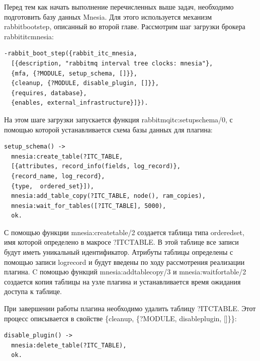 Перед тем как начать выполнение перечисленных выше задач, необходимо подготовить базу данных Mnesia. Для этого используется механизм rabbit\underline{\hspace{0.25cm}}boot\underline{\hspace{0.25cm}}step, описанный во второй главе. Рассмотрим шаг загрузки брокера rabbit\underline{\hspace{0.25cm}}itc\underline{\hspace{0.25cm}}mnesia:
\begin{lstlisting}
-rabbit_boot_step({rabbit_itc_mnesia,
  [{description, "rabbitmq interval tree clocks: mnesia"},
  {mfa, {?MODULE, setup_schema, []}},
  {cleanup, {?MODULE, disable_plugin, []}},
  {requires, database},
  {enables, external_infrastructure}]}).
\end{lstlisting}
На этом шаге загрузки запускается функция rabbitmq\underline{\hspace{0.25cm}}itc:setup\underline{\hspace{0.25cm}}schema/0, с помощью которой устанавливается схема базы данных для плагина: 
\begin{lstlisting}
setup_schema() ->
  mnesia:create_table(?ITC_TABLE,
  [{attributes, record_info(fields, log_record)},
  {record_name, log_record},
  {type,  ordered_set}]),
  mnesia:add_table_copy(?ITC_TABLE, node(), ram_copies),
  mnesia:wait_for_tables([?ITC_TABLE], 5000),
  ok.
\end{lstlisting}
С помощью функции mnesia:create\underline{\hspace{0.25cm}}table/2 создается таблица типа  ordered\underline{\hspace{0.25cm}}set, имя которой определено в макросе ?ITC\underline{\hspace{0.25cm}}TABLE. В этой таблице все записи будут иметь уникальный идентификатор. Атрибуты таблицы определены с помощью записи log\underline{\hspace{0.25cm}}record и будут введены по ходу рассмотрения реализации плагина. C помощью функций mnesia:add\underline{\hspace{0.25cm}}table\underline{\hspace{0.25cm}}copy/3 и  mnesia:wait\underline{\hspace{0.25cm}}for\underline{\hspace{0.25cm}}table/2 создается копия таблицы на узле плагина и устанавливается время ожидания доступа к таблице.

При завершении работы плагина необходимо удалить таблицу ?ITC\underline{\hspace{0.25cm}}TABLE. Этот процесс описывается в свойстве  \{cleanup, \{?MODULE, disable\underline{\hspace{0.25cm}}plugin, []\}\}:
\begin{lstlisting}
disable_plugin() ->
  mnesia:delete_table(?ITC_TABLE),
  ok.
\end{lstlisting}

